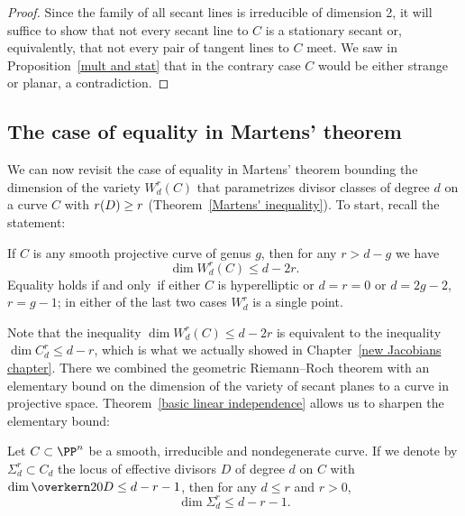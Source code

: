 \begin{proof}
Since the family of all secant lines is irreducible of dimension 2,  it
will suffice to show that not every secant line to $C$ is a 
stationary secant
%
or, equivalently, that not every pair of tangent lines to $C$
meet. We saw in Proposition~\ref{mult and stat} that in the contrary
case 
$C$ would be either strange or planar, a contradiction.
\end{proof}


\subsection*{The case of equality in Martens' theorem}

We can now revisit
the case
of equality in 
%
Martens' theorem
bounding the dimension of the variety
$W^r_d(C)$
%
that parametrizes
divisor classes of degree $d$ on a curve $C$
with $r(D) \geq\nobreak r$
(Theorem~\ref{Martens' inequality}).
To start, recall the statement:

\begin{theorem}[Martens]\label{full Martens}
If $C$ is any smooth projective curve of genus $g$, then for any $r>d-g$
we have
$$
\dim W^r_d(C) \leq d-2r.
$$
Equality holds if and only~if either $C$ is 
hyperelliptic
%
or $d=r=0$ or $d=2g-2$, $r=g-1$; in either of the last two cases $W^r_d$ is
a single point.
\unif
\end{theorem}

Note that the inequality $\dim W^r_d(C) \leq d-2r$ is equivalent to the
%
inequality $\dim 
C^r_d
\leq d-r$, which is what we actually showed
in Chapter~\ref{new Jacobians chapter}. There we combined
the geometric Riemann--Roch theorem
%
with an elementary bound on the
dimension of the variety of secant planes to a curve in projective space.
Theorem~\ref{basic linear independence} allows us to sharpen the elementary bound:

\begin{lemma}\label{Strong secant plane lemma}
Let $C \subset \PP^n$ be a smooth, irreducible and nondegenerate curve. If
%
we denote by $
\Sigma^r_d
\subset C_d$ the locus of effective divisors
%
$D$ of degree $d$ on $C$ with $\dim \overkern20 D \leq d-r-1$, then for
any $d \leq r$ and $r > 0$,
$$
\dim \Sigma^r_d \leq d-r-1.
$$
\end{lemma}

